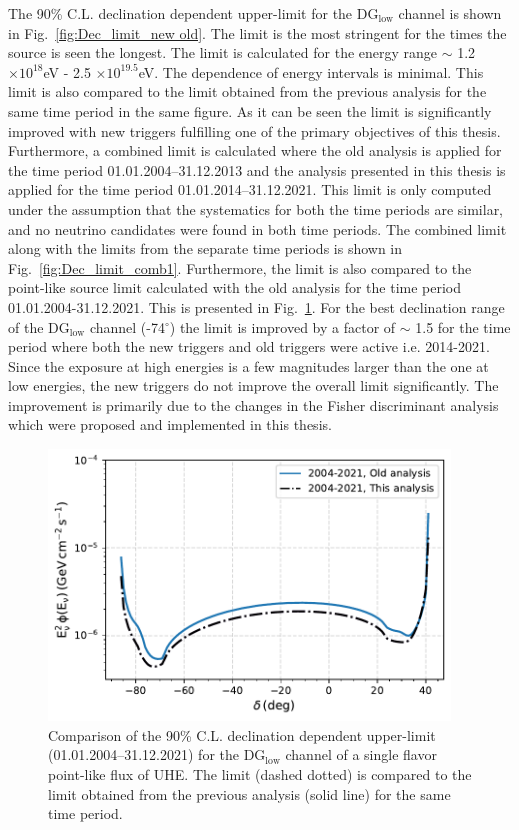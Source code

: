 The 90\% C.L. declination dependent upper-limit for the DG$_{\text{low}}$ channel is shown in Fig.~\ref{fig:Dec_limit_new old}. The limit is the most stringent for the times the source is seen the longest. The limit is calculated for the energy range $\sim$ 1.2 $\times 10^{18}$eV - 2.5 $\times 10^{19.5}$eV. The dependence of energy intervals is minimal. This limit is also compared to the limit obtained from the previous analysis for the same time period in the same figure. As it can be seen the limit is significantly improved with new triggers fulfilling one of the primary objectives of this thesis. Furthermore, a combined limit is calculated where the old analysis is applied for the time period 01.01.2004–31.12.2013 and the analysis presented in this thesis is applied for the time period 01.01.2014–31.12.2021. This limit is only computed under the assumption that the systematics for both the time periods are similar, and no neutrino candidates were found in both time periods. The combined limit along with the limits from the separate time periods is shown in Fig.~\ref{fig:Dec_limit_comb1}. Furthermore, the limit is also compared to the point-like source limit calculated with the old analysis for the time period 01.01.2004-31.12.2021. This is presented in Fig.~\ref{fig:Dec_limit_comb2}. For the best declination range of the DG$_{\text{low}}$ channel (-74$^{\circ}$) the limit is improved by a factor of $\sim$ 1.5 for the time period where both the new triggers and old triggers were active i.e. 2014-2021. Since the exposure at high energies is a few magnitudes larger than the one at low energies, the new triggers do not improve the overall limit significantly. The improvement is primarily due to the changes in the Fisher discriminant analysis which were proposed and implemented in this thesis.


\begin{figure}[ht]
  \centering
  \includegraphics[width=0.95\textwidth]{thesis_figures/PointLimits/Point_comp_combined_2.pdf}
  \caption{Comparison of the 90\% C.L. declination dependent upper-limit (01.01.2004–31.12.2021) for the DG$_{\text{low}}$ channel of a single flavor point-like flux of UHE. The limit (dashed dotted) is compared to the limit obtained from the previous analysis (solid line) for the same time period.}
  \label{fig:Dec_limit_comb2}
\end{figure}

